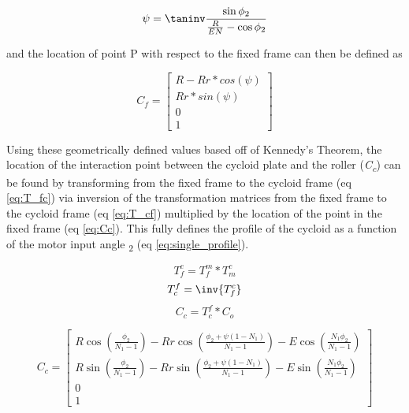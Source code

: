 \begin{equation} \label{eq:psi}
\psi = \taninv\frac{\sin\phi_2}{\frac{R}{EN} - \cos{\phi_2}}
\end{equation}

and the location of point P with respect to the fixed frame can then be defined as 

\begin{equation} \label{eq:Cf}
C_f = \left[\begin{array}{c}
		R-Rr*cos(\psi)\\
		Rr*sin(\psi)\\
		0\\
		1
		\end{array} \right]
\end{equation}

Using these geometrically defined values based off of Kennedy's Theorem, the location of the interaction point between the cycloid plate and the roller (\textit{C\textsubscript{c}}) can be found by transforming from the fixed frame to the cycloid frame (eq \ref{eq:T_fc}) via inversion of the transformation matrices from the fixed frame to the cycloid frame (eq \ref{eq:T_cf}) multiplied by the location of the point in the fixed frame (eq \ref{eq:Cc}). This fully defines the profile of the cycloid as a function of the motor input angle \textphi\textsubscript{2} (eq \ref{eq:single_profile}).

\begin{equation} \label{eq:T_fc}
T_f^c = T_f^m * T_m^c 
\end{equation}
\begin{equation} \label{eq:T_cf}
T_c^f = \inv{T_f^c}
\end{equation}
\begin{equation} \label{eq:Cc}
C_c = T_c^f * C_o
\end{equation}

\begin{equation} \label{eq:single_profile}
C_c = \left[\begin{array}{c}
		R\cos(\frac{\phi_2}{N_1 -1}) - Rr\cos(\frac{\phi_2 + \psi(1-N_1)}{N_1-1}) - E\cos(\frac{N_1\phi_2}{N_1-1})\\
		R\sin(\frac{\phi_2}{N_1 -1}) - Rr\sin(\frac{\phi_2 + \psi(1-N_1)}{N_1-1}) - E\sin(\frac{N_1\phi_2}{N_1-1})\\
		0\\
		1
		\end{array} \right]
\end{equation}

